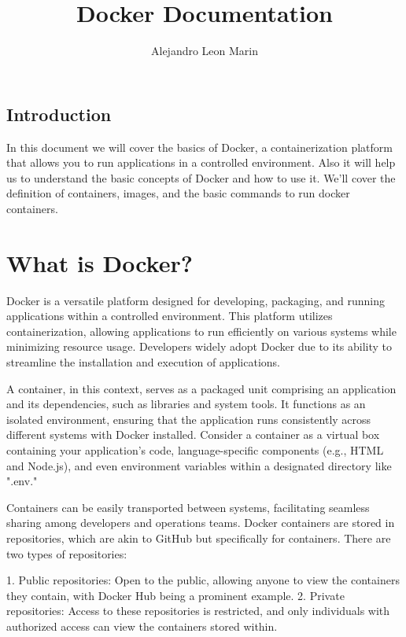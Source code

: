 \documentclass{article}
\title{Docker Documentation}
\author{Alejandro Leon Marin}
\begin{document}
\maketitle
\newpage
\begin{center}
    \section*{Introduction}
        In this document we will cover the basics of Docker, a containerization platform 
        that allows you to run applications in a controlled environment. 
        Also it will help us to understand the basic concepts of Docker and how to use it. 
        We'll cover the definition of containers, images, and the basic commands to 
        run docker containers.

\end{center}

\newpage
\section*{What is Docker?}

Docker is a versatile platform designed for developing, packaging, and running applications within a controlled environment. 
This platform utilizes containerization, allowing applications to run efficiently on various systems while minimizing resource usage. 
Developers widely adopt Docker due to its ability to streamline the installation and execution of applications.

A container, in this context, serves as a packaged unit comprising an application and its dependencies, such as libraries and system tools. 
It functions as an isolated environment, ensuring that the application runs consistently across different systems with Docker installed. 
Consider a container as a virtual box containing your application's code, language-specific components (e.g., HTML and Node.js), 
and even environment variables within a designated directory like ".env."

Containers can be easily transported between systems, facilitating seamless sharing among developers and operations teams. 
Docker containers are stored in repositories, which are akin to GitHub but specifically for containers. There are two types of repositories:

1. Public repositories: Open to the public, allowing anyone to view the containers they contain, with Docker Hub being a prominent example.
2. Private repositories: Access to these repositories is restricted, and only individuals with authorized access can view the containers stored 
within.
\end{document}
